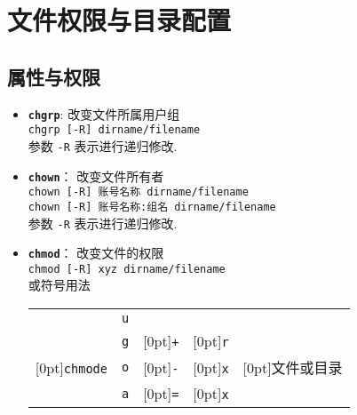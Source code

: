 \section{文件权限与目录配置}

\subsection{属性与权限}
\begin{itemize}
    \item \textbf{\texttt{chgrp}}: 改变文件所属用户组 \\
    \mbox{\qquad \texttt{chgrp [-R] dirname/filename}} \\
    参数 \texttt{-R} 表示进行递归修改.
    
    \item \textbf{\texttt{chown}}： 改变文件所有者\\
    \mbox{\qquad \texttt{chown [-R] 账号名称 dirname/filename}} \\
    \mbox{\qquad \texttt{chown [-R] 账号名称:组名 dirname/filename}} \\
    参数 \texttt{-R} 表示进行递归修改.
    
    \item \textbf{\texttt{chmod}}： 改变文件的权限\\
    \mbox{\qquad \texttt{chmod [-R] xyz dirname/filename}} \\
    或符号用法
    \begin{longtable}{c|c|c|c|c}\hline\hline
                                        & \texttt{u} &  &  &  \\
                                        & \texttt{g} & \raisebox{2.3ex}[0pt]{\texttt{+}} &  \raisebox{2.3ex}[0pt]{\texttt{r}} &  \\
\raisebox{2.3ex}[0pt]{\texttt{chmode}}  & \texttt{o} & \raisebox{2.3ex}[0pt]{\texttt{-}} &  \raisebox{2.3ex}[0pt]{\texttt{x}} & \raisebox{2.3ex}[0pt]{文件或目录} \\

                                        & \texttt{a} & \raisebox{2.3ex}[0pt]{\texttt{=}} &  \raisebox{2.3ex}[0pt]{\texttt{x}} & \\
    \hline
    \end{longtable}
\end{itemize} 

